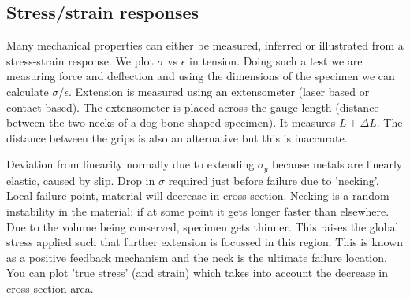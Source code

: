 \documentclass[class=report, crop=false, 12pt,a4paper]{standalone}
\begin{document}
\subsection{Stress/strain responses}
Many mechanical properties can either be measured, inferred or illustrated from a stress-strain response. We plot \(\sigma\) vs \(\epsilon\) in tension. Doing such a test we are measuring force and deflection and using the dimensions of the specimen we can calculate \(\sigma/\epsilon\). Extension is measured using an extensometer (laser based or contact based). The extensometer is placed across the gauge length (distance between the two necks of a dog bone shaped specimen). It measures \(L + \Delta L\). The distance between the grips is also an alternative but this is inaccurate. 

Deviation from linearity normally due to extending \(\sigma_y\) because metals are linearly elastic, caused by slip. Drop in \(\sigma\) required just before failure due to 'necking'. Local failure point, material will decrease in cross section. Necking is a random instability in the material; if at some point it gets longer faster than elsewhere. Due to the volume being conserved, specimen gets thinner. This raises the global stress applied such that further extension is focussed in this region. This is known as a positive feedback mechanism and the neck is the ultimate failure location. You can plot 'true stress' (and strain) which takes into account the decrease in cross section area. 
\end{document}
